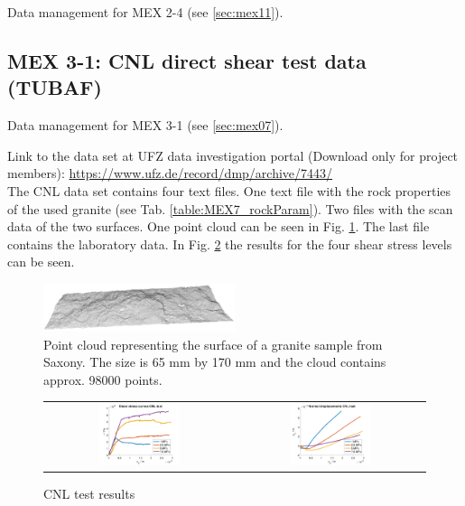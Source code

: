 Data management for MEX 2-4 (see \ref{sec:mex11}).

\subsection{MEX 3-1: CNL direct shear test data (TUBAF)}\label{DataManMex3-1CNL}

Data management for MEX 3-1 (see \ref{sec:mex07}).

Link to the data set at UFZ data investigation portal (Download only for project members):
\hyperlink{https://www.ufz.de/record/dmp/archive/7443/}{https://www.ufz.de/record/dmp/archive/7443/}\\

The CNL data set contains four text files. One text file with the rock properties of the used granite (see Tab. \ref{table:MEX7_rockParam}). Two files with the scan data of the two surfaces. One point cloud can be seen in Fig. \ref{fig:DataCNLGranitePointCloud}. The last file contains the laboratory data. In Fig. \ref{fig:DataCNLGraniteLab} the results for the four shear stress levels can be seen.

\begin{figure}[!ht]
\begin{center}
\includegraphics[width=0.5\textwidth]{./figures/MEX7_Point_cloud.png}
\end{center}
\caption{Point cloud representing the surface of a granite sample from Saxony. The size is 65 mm by 170 mm and the cloud contains approx. 98000 points.}
\label{fig:DataCNLGranitePointCloud}
\end{figure}

\begin{figure}[!ht]
\begin{tabular}{cc}
\includegraphics[width=0.45\textwidth]{./figures/CNLShearCurvesAll.png}     
& 
\includegraphics[width=0.45\textwidth]{./figures/CNLDilatationAll.png} 
\end{tabular}
\caption{CNL test results}
\label{fig:DataCNLGraniteLab}
\end{figure}

